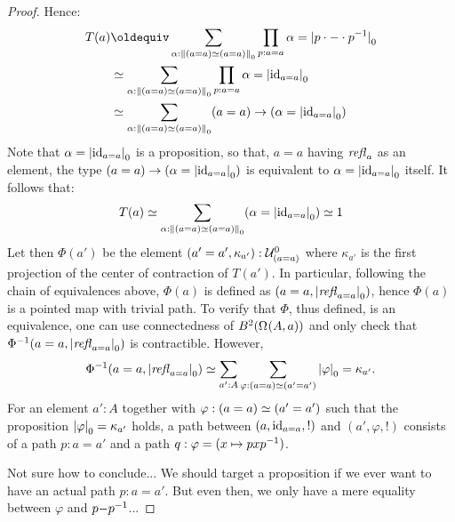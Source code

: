 \begin{proof}
  Hence:
  \begin{align*}
    T(a)
    &\jdeq \sum_{\alpha:\setTrunc{(a=a)\weq(a=a)}}\prod_{p:a=a}
      \alpha = \settrunc{p\cdot \blank \cdot \inv p}
    \\
    &\weq \sum_{\alpha:\setTrunc{(a=a)\weq(a=a)}}\prod_{p:a=a}
      \alpha = \settrunc{\id_{a=a}}
    \\ 
    &\weq \sum_{\alpha:\setTrunc{(a=a)\weq(a=a)}}(a=a) \to 
      (\alpha = \settrunc{\id_{a=a}})
  \end{align*}
  Note that $\alpha = {\lvert\mathord{\mathrm{id}}_{a=a}\rvert}_0$ is a proposition, so that,
  $a=a$ having $\mathop{\mathit{refl}_{a}}$ as an element, the type
  $(a=a) \to (\alpha = {\lvert\mathord{\mathrm{id}}_{a=a}\rvert}_0)$ is equivalent to
  $\alpha = {\lvert\mathord{\mathrm{id}}_{a=a}\rvert}_0$ itself. It follows that:
  \begin{displaymath}
    T(a)
    \simeq \sum_{\alpha:{\lVert(a=a)\simeq(a=a)\rVert}_0}( \alpha =
    {\lvert\mathord{\mathrm{id}}_{a=a}\rvert}_0 )
    \simeq 1
  \end{displaymath}
  Let then $\Phi (a')$ be the element
  $(a'=a', \kappa_{a'}):{{\mathcal{U}}^0_{\left(a=a\right)}}$ where $\kappa_{a'}$ is
  the first projection of the center of contraction of $T(a')$. In
  particular, following the chain of equivalences above, $\Phi(a)$ is
  defined as $(a=a, {\lvert\mathop{\mathit{refl}_{a=a}}\rvert}_0)$, hence $\Phi(a)$ is a
  pointed map with trivial path. To verify that $\Phi$, thus defined,
  is an equivalence, one can use connectedness of
  $\BB(\loopspace (A,a))$ and only check that
  $\Phi^{-1}(a=a,{\lvert\mathop{\mathit{refl}_{a=a}}\rvert}_0)$ is contractible. However,
  \begin{displaymath}
    \Phi^{-1}(a=a,{\lvert\mathop{\mathit{refl}_{a=a}}\rvert}_0) \simeq \sum_{a':A}
    \sum_{\varphi : (a=a) \simeq (a'=a')}{\lvert\varphi\rvert}_0 = \kappa_{a'}.
  \end{displaymath}
  For an element $a':A$ together with $\varphi: (a=a) \simeq (a'=a')$
  such that the proposition ${\lvert\varphi\rvert}_0 = \kappa_{a'}$ holds, a
  path between $(a,\mathord{\mathrm{id}}_{a=a},!)$ and $(a',\varphi,!)$ consists of a
  path $p:a=a'$ and a path $q:\varphi = (x\mapsto p x p^{-1})$.

  {\color{red} Not sure how to conclude... We should target a
    proposition if we ever want to have an actual path $p:a=a'$. But
    even then, we only have a mere equality between $\varphi$ and
    $p{-}p^{-1}$...}
\end{proof}


